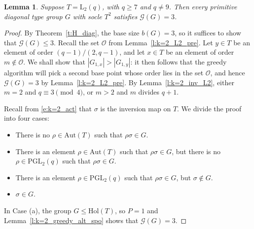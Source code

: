 \documentclass[twoside,a4paper,reqno,11pt]{amsart}
\newcommand{\<}{\langle}
\renewcommand{\>}{\rangle}
\newcommand{\leqs}{\leqslant}
\newcommand{\geqs}{\geqslant}
\newcommand{\Aut}{\mathrm{Aut}}
\newcommand{\PGL}{\mathrm{PGL}}
\newcommand{\LL}{\mathrm{L}}
\newcommand{\Hol}{\mathrm{Hol}}
\newtheorem{lem}[thm]{Lemma}
\theoremstyle{definition}
\begin{document}
\begin{lem}
    \label{l:k=2_L2}
    Suppose $T = \LL_2(q)$, with $q\geqs 7$ and $q\ne 9$. Then every primitive diagonal type group $G$ with socle $T^2$ satisfies $\mathcal{G}(G) = 3$.
\end{lem}

\begin{proof}
By Theorem~\ref{t:H_diag}, the base size $b(G) = 3$, so it suffices to show that $\mathcal{G}(G) \leqs 3$. Recall the set $\mathcal{O}$ from Lemma~\ref{l:k=2_L2_pre}.
    Let $y\in T$ be an element of order $(q-1)/(2,q-1)$, and let $x\in T$ be an element of order $m \not\in \mathcal{O}$. We shall show that $|G_{1, x}| > |G_{1, y}|$: it then follows that the greedy algorithm will pick a second base point whose order lies in the set $\mathcal{O}$, and hence $\mathcal{G}(G) = 3$ by Lemma~\ref{l:k=2_L2_pre}. 
    By Lemma~\ref{l:k=2_inv_L2}, either $m = 2$ and $q\equiv 3\pmod 4$, or $m > 2$ and $m$ divides $q+1$. 
    
    Recall from \eqref{e:k=2_act} that $\sigma$ is the inversion map on $T$. We divide the proof into four cases:
    \begin{itemize}\addtolength{\itemsep}{0.2\baselineskip}
		\item[{\rm (a)}] There is no $\rho\in\Aut(T)$ such that $\rho\sigma\in G$.
        \item[{\rm (b)}] There is an element $\rho\in\Aut(T)$ such that $\rho\sigma\in G$, but there is no $\rho\in\PGL_2(q)$ such that $\rho\sigma\in G$.
		\item[{\rm (c)}] There is an element $\rho\in\PGL_2(q)$ such that $\rho\sigma\in G$, but $\sigma\notin G$.
        \item[{\rm (d)}] $\sigma\in G$.
    \end{itemize}
    
    In Case (a), the group $G\leqs \Hol(T)$, so $P = 1$ and Lemma~\ref{l:k=2_greedy_alt_spo} shows that $\mathcal{G}(G) = 3$.


\end{proof}
\end{document}
